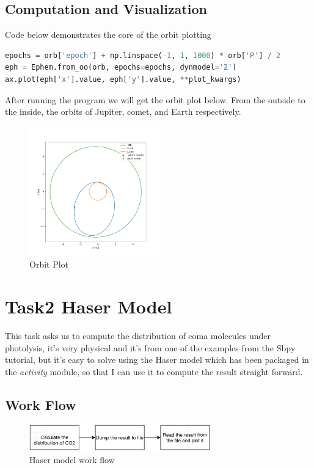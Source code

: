 \documentclass{report}
\begin{document}
\subsection{Computation and Visualization}
Code below demonstrates the core of the orbit plotting
\begin{lstlisting}[language=Python]
epochs = orb['epoch'] + np.linspace(-1, 1, 1000) * orb['P'] / 2
eph = Ephem.from_oo(orb, epochs=epochs, dynmodel='2')
ax.plot(eph['x'].value, eph['y'].value, **plot_kwargs)
\end{lstlisting}
After running the program we will get the orbit plot below.
From the outside to the inside, the orbits of Jupiter, comet, and Earth respectively.
\begin{figure}[htb]
    \centering
    \includegraphics[width=0.5\textwidth]{orbit}
    \caption{Orbit Plot}
    \label{fig:OrbitPlot}
\end{figure}

\section{Task2 Haser Model}
This task asks us to compute the distribution of coma molecules under photolysis, it's very physical and it's from one of the examples from the Sbpy tutorial, but it's easy to solve using the Haser model which has been packaged in the \emph{activity} module, so that I can use it to compute the result straight forward.

\subsection{Work Flow}
\begin{figure}[htb]
    \centering
    \includegraphics[width=0.7\textwidth]{task2.png}
    \caption{Haser model work flow}
    \label{fig:haser_workflow}
\end{figure}
\end{document}
